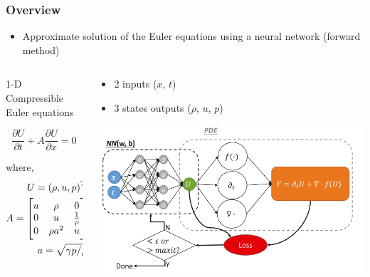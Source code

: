 \documentclass[aspectratio=169]{beamer}
\begin{document}
\begin{frame}\frametitle{Overview}

	\begin{itemize}
		\item Approximate solution of the Euler equations using a neural network (forward method)
	\end{itemize}
	
	\vspace{2mm}
	
	\begin{columns}
		\begin{column}{0.5\textwidth}			
			1-D Compressible Euler equations
			
			\begin{equation*}
				\frac{\partial U}{\partial t} + A \frac{\partial U}{\partial x} = 0
			\end{equation*}
			
			where,			
			\begin{align*}
				U = \left ( \rho, u, p \right)^T \\
				\vspace{10pt}
				A = \begin{bmatrix}
					u & \rho & 0 \\
					0 & u & \frac{1}{\rho} \\
					0 & \rho a^2 & u
				\end{bmatrix} \\
				a = \sqrt{\gamma p / \rho}
			\end{align*}
			
		\end{column}
		
		\begin{column}{0.5\textwidth}
			
			\begin{itemize}
				\item 2 inputs ($x$, $t$)
				\item 3 states outputs ($\rho$, $u$, $p$)
			\end{itemize}
			
			
			\begin{center}
				\includegraphics[width=1.\textwidth]{Figures/neural_network_architecture.png}
			\end{center}			
		\end{column}
	\end{columns}

\end{frame}
\end{document}
